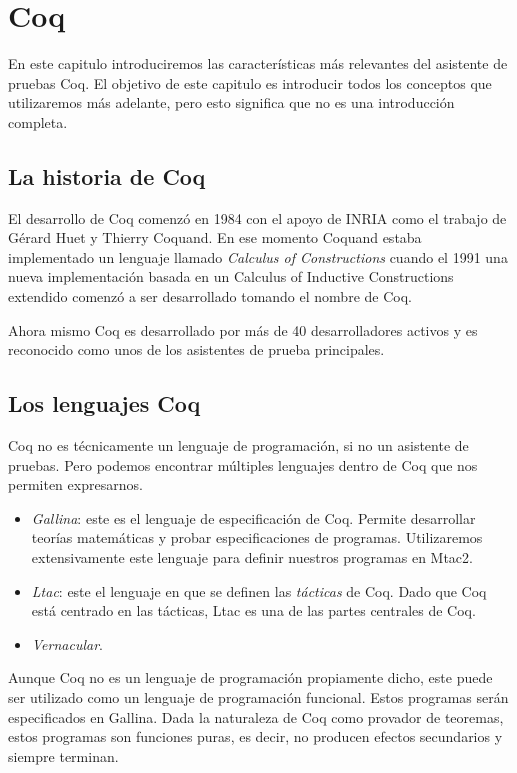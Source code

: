 \section{Coq}

En este capitulo introduciremos las características más relevantes del asistente de pruebas Coq. El objetivo de este capitulo es introducir todos los conceptos que utilizaremos más adelante, pero esto significa que no es una introducción completa.

\subsection{La historia de Coq}

El desarrollo de Coq comenzó en 1984 con el apoyo de INRIA como el trabajo de Gérard Huet y Thierry Coquand. En ese momento Coquand estaba implementado un lenguaje llamado \textit{Calculus of Constructions} cuando el 1991 una nueva implementación basada en un Calculus of Inductive Constructions extendido comenzó a ser desarrollado tomando el nombre de Coq.

Ahora mismo Coq es desarrollado por más de 40 desarrolladores activos y es reconocido como unos de los asistentes de prueba principales.

\subsection{Los lenguajes Coq}

Coq no es técnicamente un lenguaje de programación, si no un asistente de pruebas. Pero podemos encontrar múltiples lenguajes dentro de Coq que nos permiten expresarnos. 
\begin{itemize}
    \item \textit{Gallina}: este es el lenguaje de especificación de Coq. Permite desarrollar teorías matemáticas y probar especificaciones de programas. Utilizaremos extensivamente este lenguaje para definir nuestros programas en Mtac2.
    \item \textit{Ltac}: este el lenguaje en que se definen las \textit{tácticas} de Coq. Dado que Coq está centrado en las tácticas, Ltac es una de las partes centrales de Coq.
    \item \textit{Vernacular}.
\end{itemize}

Aunque Coq no es un lenguaje de programación propiamente dicho, este puede ser utilizado como un lenguaje de programación funcional. Estos programas serán especificados en Gallina. Dada la naturaleza de Coq como provador de teoremas, estos programas son funciones puras, es decir, no producen efectos secundarios y siempre terminan.


